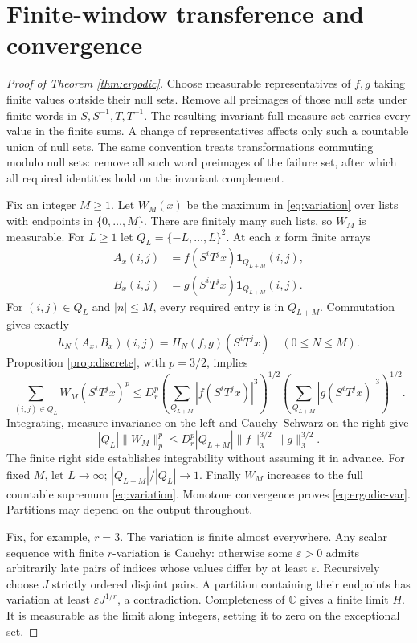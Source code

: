 \documentclass[11pt]{article}
\begin{document}
\section{Finite-window transference and convergence}
\begin{proof}[Proof of Theorem \ref{thm:ergodic}]
Choose measurable representatives of $f,g$ taking finite values outside
their null sets. Remove all preimages of those null sets under finite
words in $S,S^{-1},T,T^{-1}$.
The resulting invariant full-measure set carries every value in the
finite sums. A change of representatives affects only such a countable
union of null sets. The same convention treats transformations commuting
modulo null sets: remove all such word preimages of the failure set, after
which all required identities hold on the invariant complement.

Fix an integer $M\ge1$. Let $W_M(x)$ be the maximum in
\eqref{eq:variation} over lists with endpoints in $\{0,\ldots,M\}$.
There are finitely many such lists, so $W_M$ is measurable. For
$L\ge1$ let $Q_L=\{-L,\ldots,L\}^2$. At each $x$ form finite arrays
\[
 \begin{split}
 A_x(i,j)&=f(S^iT^j x)\mathbf1_{Q_{L+M}}(i,j),\\
 B_x(i,j)&=g(S^iT^j x)\mathbf1_{Q_{L+M}}(i,j).
 \end{split}
\]
For $(i,j)\in Q_L$ and $|n|\le M$, every required entry is in
$Q_{L+M}$. Commutation gives exactly
\[
 h_N(A_x,B_x)(i,j)=H_N(f,g)(S^iT^j x)\quad(0\le N\le M).
\]
Proposition \ref{prop:discrete}, with $p=3/2$, implies
\[
 \sum_{(i,j)\in Q_L}W_M(S^iT^j x)^p
 \le D_r^p
 \left(\sum_{Q_{L+M}}|f(S^iT^j x)|^3\right)^{1/2}
 \left(\sum_{Q_{L+M}}|g(S^iT^j x)|^3\right)^{1/2}.
\]
Integrating, measure invariance on the left and Cauchy--Schwarz on
the right give
\[
 |Q_L|\|W_M\|_p^p
 \le D_r^p|Q_{L+M}|\|f\|_3^{3/2}\|g\|_3^{3/2}.
\]
The finite right side establishes integrability without assuming it in
advance. For fixed $M$, let $L\to\infty$;
$|Q_{L+M}|/|Q_L|\to1$. Finally $W_M$ increases to the full countable
supremum \eqref{eq:variation}. Monotone convergence proves
\eqref{eq:ergodic-var}. Partitions may depend on the output throughout.

Fix, for example, $r=3$. The variation is finite almost everywhere.
Any scalar sequence with finite $r$-variation is Cauchy: otherwise
some $\varepsilon>0$ admits arbitrarily late pairs of indices whose
values differ by at least $\varepsilon$. Recursively choose $J$
strictly ordered disjoint pairs. A partition containing their endpoints
has variation at least $\varepsilon J^{1/r}$, a contradiction.
Completeness of $\mathbb C$ gives a finite limit $H$. It is measurable
as the limit along integers, setting it to zero on the exceptional set.


\end{proof}
\end{document}
